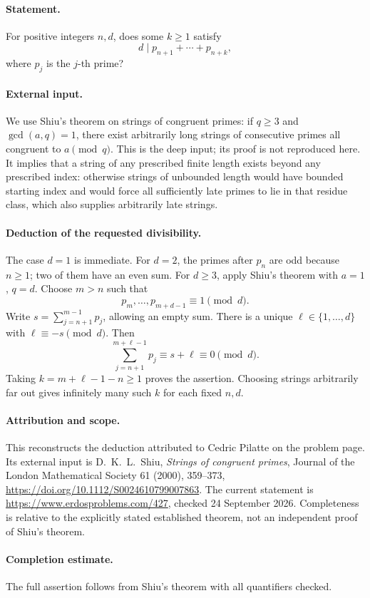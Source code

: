 \paragraph{Statement.}
For positive integers \(n,d\), does some \(k\geq1\) satisfy
\[
 d\mid p_{n+1}+\cdots+p_{n+k},
\]
where \(p_j\) is the \(j\)-th prime?

\paragraph{External input.}
We use Shiu's theorem on strings of congruent primes: if \(q\geq3\)
and \(\gcd(a,q)=1\), there exist arbitrarily long strings of consecutive
primes all congruent to \(a\pmod q\).
This is the deep input; its proof is not reproduced here.
It implies that a string of any prescribed finite length exists beyond
any prescribed index: otherwise strings of unbounded length would have
bounded starting index and would force all sufficiently late primes to
lie in that residue class, which also supplies arbitrarily late strings.

\paragraph{Deduction of the requested divisibility.}
The case \(d=1\) is immediate. For \(d=2\), the primes after \(p_n\)
are odd because \(n\geq1\); two of them have an even sum.
For \(d\geq3\), apply Shiu's theorem with \(a=1\), \(q=d\).
Choose \(m>n\) such that
\[
 p_m,\ldots,p_{m+d-1}\equiv1\pmod d.
\]
Write \(s=\sum_{j=n+1}^{m-1}p_j\), allowing an empty sum. There is a
unique \(\ell\in\{1,\ldots,d\}\) with \(\ell\equiv-s\pmod d\).
Then
\[
 \sum_{j=n+1}^{m+\ell-1}p_j
 \equiv s+\ell\equiv0\pmod d.
\]
Taking \(k=m+\ell-1-n\geq1\) proves the assertion. Choosing strings
arbitrarily far out gives infinitely many such \(k\) for each fixed
\(n,d\).

\paragraph{Attribution and scope.}
This reconstructs the deduction attributed to Cedric Pilatte on the
problem page. Its external input is
D.~K.~L.~Shiu, \emph{Strings of congruent primes},
Journal of the London Mathematical Society 61 (2000), 359--373,
\url{https://doi.org/10.1112/S0024610799007863}.
The current statement is \url{https://www.erdosproblems.com/427},
checked 24 September 2026. Completeness is relative to the explicitly
stated established theorem, not an independent proof of Shiu's theorem.

\paragraph{Completion estimate.}
The full assertion follows from Shiu's theorem with all quantifiers checked.

